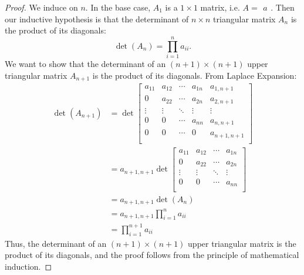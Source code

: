 \begin{proof}
    We induce on $n.$ In the base case, $A_1$ is a $1\times 1$ matrix, i.e. $A=\begin{matrix}a\end{matrix}.$ Then our inductive hypothesis is that the determinant of $n\times n$ triangular matrix $A_n$ is the product of its diagonals: $$\det(A_n) = \prod\limits_{i=1}^{n} a_{ii}.$$ We want to show that the determinant of an $(n+1)\times(n+1)$ upper triangular matrix $A_{n+1}$ is the product of its diagonals. From Laplace Expansion:
    \begin{align*}
        \det(A_{n+1}) &= \det\begin{bmatrix}
        a_{11} & a_{12} & \cdots & a_{1n} & a_{1,n+1} \\
        0 & a_{22} & \cdots & a_{2n} & a_{2,n+1} \\
        \vdots & \vdots & \ddots & \vdots & \vdots \\
        0 & 0 & \cdots & a_{nn} & a_{n,n+1} \\
        0 & 0 & \cdots & 0 & a_{n+1,n+1} \\
        \end{bmatrix} \\
        &= a_{n+1,n+1}\det\begin{bmatrix}
        a_{11} & a_{12} & \cdots & a_{1n} \\
        0 & a_{22} & \cdots & a_{2n} \\
        \vdots & \vdots & \ddots & \vdots \\
        0 & 0 & \cdots & a_{nn} \\
        \end{bmatrix} \\
        &= a_{n+1,n+1}\det(A_n) \\
        &= a_{n+1,n+1}\prod\limits_{i=1}^{n} a_{ii} \\
        &= \prod\limits_{i=1}^{n+1} a_{ii}
    \end{align*}
    Thus, the determinant of an $(n+1)\times(n+1)$ upper triangular matrix is the product of its diagonals, and the proof follows from the principle of mathematical induction.
  \end{proof}